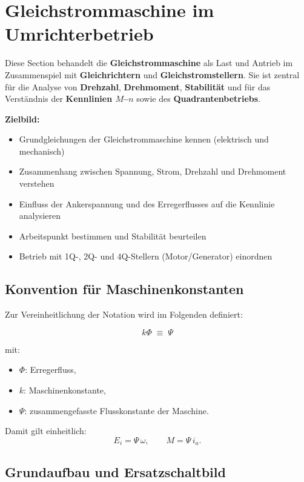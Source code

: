 \section{Gleichstrommaschine im Umrichterbetrieb}

Diese Section behandelt die \textbf{Gleichstrommaschine} als Last und Antrieb im Zusammenspiel mit
\textbf{Gleichrichtern} und \textbf{Gleichstromstellern}.
Sie ist zentral für die Analyse von \textbf{Drehzahl}, \textbf{Drehmoment}, \textbf{Stabilität} und
für das Verständnis der \textbf{Kennlinien $M$--$n$} sowie des \textbf{Quadrantenbetriebs}.

\smallskip

\textbf{Zielbild:}
\begin{itemize}
    \item Grundgleichungen der Gleichstrommaschine kennen (elektrisch und mechanisch)
    \item Zusammenhang zwischen Spannung, Strom, Drehzahl und Drehmoment verstehen
    \item Einfluss der Ankerspannung und des Erregerflusses auf die Kennlinie analysieren
    \item Arbeitspunkt bestimmen und Stabilität beurteilen
    \item Betrieb mit 1Q-, 2Q- und 4Q-Stellern (Motor/Generator) einordnen
\end{itemize}

\subsection*{Konvention für Maschinenkonstanten}

Zur Vereinheitlichung der Notation wird im Folgenden definiert:

\[
\boxed{k\Phi \;\equiv\; \Psi}
\]

mit:
\begin{itemize}
    \item $\Phi$: Erregerfluss,
    \item $k$: Maschinenkonstante,
    \item $\Psi$: zusammengefasste Flusskonstante der Maschine.
\end{itemize}

Damit gilt einheitlich:
\[
E_i = \Psi \, \omega,
\qquad
M = \Psi \, i_a.
\]


\subsection{Grundaufbau und Ersatzschaltbild}

